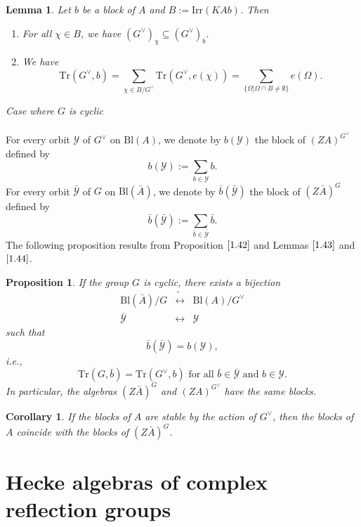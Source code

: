 \documentclass[10pt,a4paper,titlepage]{article}
\newtheorem{lemma}[theorem]{Lemma}
\newtheorem{corollary}[theorem]{Corollary}
\newtheorem{proposition}[theorem]{Proposition}
\begin{document}
\begin{lemma}\label{1.44}
Let $b$ be a block of $A$ and $B:=\mathrm{Irr}(KAb)$. Then
\begin{enumerate}[(1)]
  \item For all $\chi \in B$, we have $(G^\vee)_\chi \subseteq (G^\vee)_b$.
  \item We have
  $$\mathrm{Tr}(G^\vee,b)=\sum_{\chi\in B/G^\vee} \mathrm{Tr}(G^\vee,e(\chi))=
  \sum_{\{\Omega|\Omega\cap B \neq \emptyset \}}e(\Omega).$$
\end{enumerate}
\end{lemma}
\emph{Case where $G$ is cyclic}\\
\\
For every orbit $\mathcal{Y}$ of $G^\vee$ on $\mathrm{Bl}(A)$, we
denote by $b(\mathcal{Y})$ the block of $(ZA)^{G^\vee}$ defined by
$$b(\mathcal{Y}):=\sum_{b \in \mathcal{Y}}b.$$
For every orbit $\bar{\mathcal{Y}}$ of $G$ on
$\mathrm{Bl}(\bar{A})$, we denote by $\bar{b}(\bar{\mathcal{Y}})$
the block of $(Z\bar{A})^G$ defined by
$$\bar{b}(\bar{\mathcal{Y}}):=\sum_{\bar{b} \in \bar{\mathcal{Y}}}\bar{b}.$$
The following proposition results from Proposition $\ref{1.42}$ and
Lemmas $\ref{1.43}$ and $\ref{1.44}$.

\begin{proposition}\label{1.45}
If the group $G$ is cyclic, there exists a bijection
$$\begin{array}{ccc}
    \mathrm{Bl}(\bar{A})/G & \tilde{\leftrightarrow} & \mathrm{Bl}(A)/G^\vee \\
    \bar{\mathcal{Y}} & \leftrightarrow & \mathcal{Y}
  \end{array}$$
such that
$$\bar{b}(\bar{\mathcal{Y}})=b(\mathcal{Y}),$$
i.e.,
$$\mathrm{Tr}(G,\bar{b})=\mathrm{Tr}(G^\vee,b) \textrm{ for all }
\bar{b} \in \bar{\mathcal{Y}} \textrm{ and } b \in \mathcal{Y}.$$ In
particular, the algebras $(Z\bar{A})^G$ and $(ZA)^{G^\vee}$ have the
same blocks.
\end{proposition}

\begin{corollary}\label{clifford}
If the blocks of $A$ are stable by the action of $G^\vee$, then the
blocks of $A$ coincide with the blocks of $(Z\bar{A})^G$.
\end{corollary}

\section {Hecke algebras of complex reflection groups}
\end{document}
